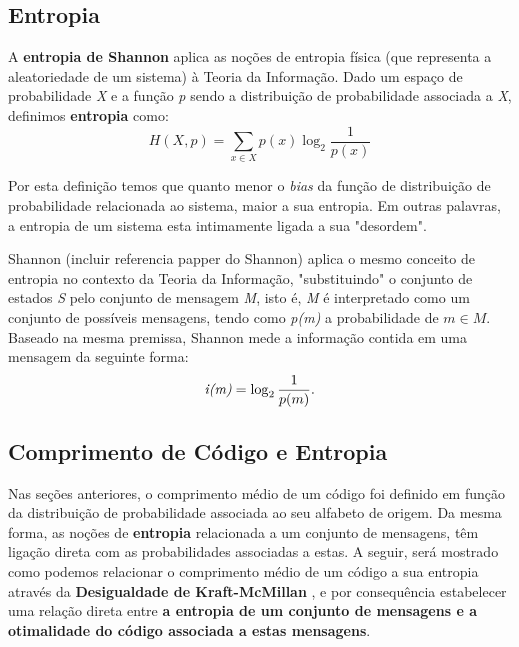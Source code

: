 \subsection{Entropia}
A \textbf{entropia de Shannon} aplica as noções de entropia física (que representa a aleatoriedade de um sistema) à Teoria da Informação. Dado um espaço de probabilidade \emph{X} e a função \emph{p} sendo a distribuição de probabilidade associada a \emph{X}, definimos \textbf{entropia} como:
\begin{equation} \label{eq:entropy}
H(X, p) = \sum_{x \in X}^{} p(x) \log_2 \frac{1}{p(x)}
\end{equation}

Por esta definição temos que quanto menor o \emph{bias} da função de distribuição de probabilidade relacionada ao sistema, maior a sua entropia. Em outras palavras, a entropia de um sistema esta intimamente ligada a sua  "desordem". 

Shannon (incluir referencia papper do Shannon) aplica o mesmo conceito de entropia no contexto da Teoria da Informação, "substituindo" o conjunto de estados \emph{S} pelo conjunto de mensagem \emph{M}, isto é, \emph{M} é interpretado como um conjunto de possíveis mensagens, tendo como \emph{p(m)} a probabilidade de $m \in M$.
Baseado na mesma premissa, Shannon mede a informação contida em uma mensagem da seguinte forma:
\begin{equation} \label{label:info_quantity}
\emph{i(m)} = \log_2 \frac{1}{p(m)}.
\end{equation}

\subsection{Comprimento de Código e Entropia}
Nas seções anteriores, o comprimento médio de um código  foi definido em função da distribuição de probabilidade associada ao seu alfabeto de origem.
Da mesma forma, as noções de \textbf{entropia} relacionada a um conjunto de mensagens, têm ligação direta com as probabilidades associadas a estas. 
A seguir, será mostrado como podemos relacionar o comprimento médio de um código a sua entropia através da \textbf{Desigualdade de Kraft-McMillan} , e por consequência estabelecer uma relação direta entre \textbf{a entropia de um conjunto de mensagens e a otimalidade do código associada a estas mensagens}.

